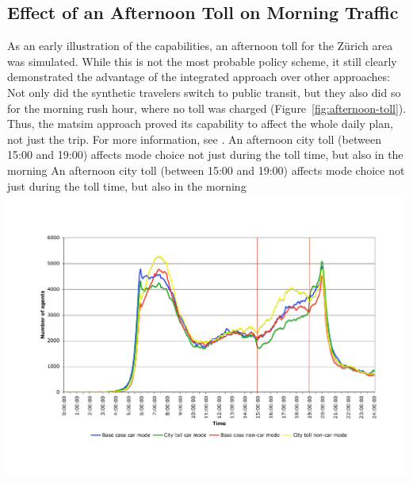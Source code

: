 \subsection{Effect of an Afternoon Toll on Morning Traffic}
As an early illustration of the capabilities, an afternoon toll for the Zürich area was simulated.  While this is not the most probable policy scheme, it still clearly demonstrated the advantage of the integrated approach over other approaches: Not only did the synthetic travelers switch to public transit, but they also did so for the morning rush hour, where no toll was charged (Figure~\ref{fig:afternoon-toll}). Thus, the \gls{matsim} approach proved its capability to affect the whole daily plan, not just the trip. For more information, see \citet{RieserEtAl_TRBTDF_2008}.
%
\createfigure%
{An afternoon city toll (between 15:00 and 19:00) affects mode choice not just during the toll time, but also in the morning}%
{An afternoon city toll (between 15:00 and 19:00) affects mode choice not just during the toll time, but also in the morning}%
{\label{fig:afternoon-toll}}%
{\includegraphics[width=0.99\hsize,trim=2cm 2.5cm 2cm 3cm,clip]{extending/figures/roadpricing/583vs585onRoute.pdf}}%
{}

